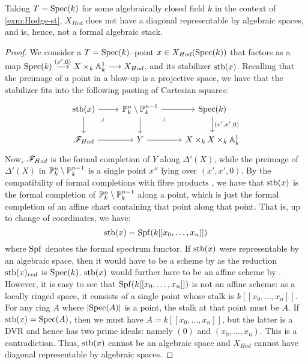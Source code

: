 \documentclass[11pt]{amsart}
\begin{document}
\begin{prop}\label{prop:Hodge-st-diag-non-rep}
Taking $T = \mathrm{Spec}(k)$ for some algebraically closed field $k$ in the
context of \cref{exm:Hodge-st},
$X_{Hod}$ does not have a diagonal representable
by algebraic spaces, and is, hence, not a formal algebraic stack.
\end{prop}
\begin{proof}
We consider a $T= \mathrm{Spec}(k)$--point
$x \in X_{Hod}(\mathrm{Spec}(k))$ that factors as a map
$\Spec(k) \to[{(x', 0)}] X \times_k \bA^1_k \to X_{Hod}$,
and its stabilizer $\mathrm{stb}(x)$. Recalling that the preimage of a point in a
blow-up is a projective space, we have that the stabilizer
fits into the following pasting of Cartesian squares:
\[\begin{tikzcd}
\stb(x) \ar[r] \ar[d] \ar[rd, phantom, "\lrcorner" very near start] &
\bP^n_k \setminus \bP^{n - 1}_k \ar[r] \ar[d]
  \ar[rd, phantom, "\lrcorner" very near start]&
\Spec(k) \ar[d, "{(x', x', 0)}"] \\
\sF_{Hod} \ar[r] & Y \ar[r] & X \times_k X \times_k \bA^1_k
\end{tikzcd}\]
Now, $\mathscr{F}_{Hod}$ is the formal completion of $Y$ along $\Delta'(X)$, while
the preimage of $\Delta'(X)$ in $\mathbb{P}^n_k \setminus \mathbb{P}^{n - 1}_k$
is a single point $x''$ lying over $(x', x', 0)$. By the compatibility of
formal completions with fibre products
\cite[\href{https://stacks.math.columbia.edu/tag/0APV}{Lemma 0APV}]
{stacks-project}, we have that $\mathrm{stb}(x)$ is the formal completion
of $\mathbb{P}^{n}_k \setminus \mathbb{P}^{n - 1}_k$ along a point, which is just
the formal completion of an affine chart containing that point along that
point. That is, up to change of coordinates, we have:
\[
\mathrm{stb}(x) = \mathrm{Spf}(k[[x_0, \dots, x_n]])
\]
where $\mathrm{Spf}$ denotes the formal spectrum functor. If $\mathrm{stb}(x)$ were
representable by an algebraic space, then it would have to be a scheme
by \cite[Corollary 3.1.2]{NagataComp} as the reduction $\mathrm{stb}(x)_{red}$ is
$\mathrm{Spec}(k)$. $\mathrm{stb}(x)$ would further have to be an affine scheme by
\cite[\href{https://stacks.math.columbia.edu/tag/06AD}{Lemma 06AD}]
{stacks-project}.
However, it is easy to see that
$\mathrm{Spf}(k[[x_0, \dots, x_n]])$ is not an affine scheme: as a locally
ringed space, it consists of a single point whose stalk is
$k[[x_0, \dots, x_n]]$. For any ring $A$ where $|\mathrm{Spec}(A)|$ is a point,
the stalk at that point must be $A$. If $\mathrm{stb}(x) = \mathrm{Spec}(A)$,
then we must have $A = k[[x_0, \dots, x_n]]$, but the latter is a DVR
and hence has two prime ideals: namely $(0)$ and $(x_0, \dots, x_n)$. This is a
contradiction. Thus, $\mathrm{stb}(x)$ cannot be an algebraic space
and $X_{Hod}$ cannot have diagonal representable by algebraic spaces.
\end{proof}
\end{document}
